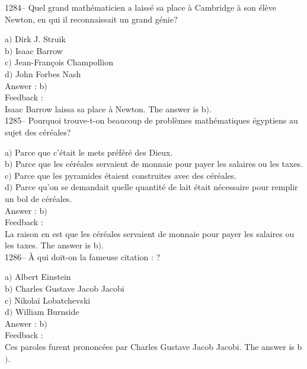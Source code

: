 \documentclass[letterpaper, 12pt]{article}
\begin{document}
1284-- Quel grand math\'ematicien a laiss\'e sa place \`a Cambridge
\`a son \'el\`eve Newton, en qui il reconnaissait un grand g\'enie?

a$)$ Dirk J. Struik \\
b$)$ Isaac Barrow \\
c$)$ Jean-Fran\c cois Champollion \\
d$)$ John Forbes Nash\\

Answer : b$)$\\

Feedback : \\
Isaac Barrow laissa sa place \`a Newton.
The answer is  b$)$.\\

1285-- Pourquoi trouve-t-on beaucoup de probl\`emes math\'ematiques
\'egyptiens au sujet des c\'er\'eales?

a$)$ Parce que c'\'etait le mets pr\'ef\'er\'e des Dieux. \\
b$)$ Parce que les c\'er\'eales servaient de monnaie pour payer les salaires
ou les taxes. \\
c$)$ Parce que les pyramides \'etaient construites avec des c\'er\'eales. \\
d$)$ Parce qu'on se demandait quelle quantit\'e de lait \'etait n\'ecessaire
pour remplir un bol de c\'er\'eales. \\


Answer : b$)$\\

Feedback : \\
La raison en est que les c\'er\'eales servaient de monnaie pour
payer les salaires ou les taxes.
The answer is  b$)$.\\

1286-- \`A qui doit-on la fameuse citation : \fg?

a$)$ Albert Einstein \\
b$)$ Charles Gustave Jacob Jacobi \\
c$)$ Nikola\"i Lobatchevski \\
d$)$ William Burnside\\

Answer : b$)$\\

Feedback : \\
Ces paroles furent prononc\'ees par Charles Gustave Jacob Jacobi.
The answer is  b$)$.\\
\end{document}
